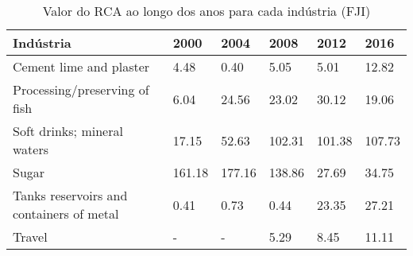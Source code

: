 \begin{table}
\centering
\caption{Valor do RCA ao longo dos anos para cada indústria (FJI)}
\label{tab:ex3-tempo-FJI}
\begin{tabular}{p{6cm}p{1.5cm}p{1.5cm}p{1.5cm}p{1.5cm}p{1.5cm}}
\toprule
                               Indústria &   2000 &   2004 &   2008 &   2012 &   2016 \\
\midrule
                 Cement lime and plaster &   4.48 &   0.40 &   5.05 &   5.01 &  12.82 \\
           Processing/preserving of fish &   6.04 &  24.56 &  23.02 &  30.12 &  19.06 \\
             Soft drinks; mineral waters &  17.15 &  52.63 & 102.31 & 101.38 & 107.73 \\
                                   Sugar & 161.18 & 177.16 & 138.86 &  27.69 &  34.75 \\
Tanks reservoirs and containers of metal &   0.41 &   0.73 &   0.44 &  23.35 &  27.21 \\
                                  Travel &      - &      - &   5.29 &   8.45 &  11.11 \\
\bottomrule
\end{tabular}
\end{table}
